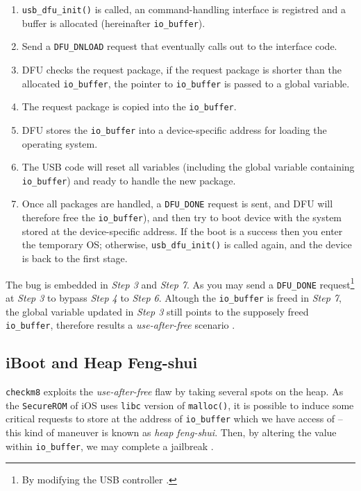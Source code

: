 \documentclass[10pt]{article}
\newcommand{\inlinecode}{\texttt}
\begin{document}
\begin{enumerate}
    \item \inlinecode{usb\_dfu\_init()} is called, an command-handling interface is registred and a buffer is allocated (hereinafter \inlinecode{io\_buffer}).
    \item Send a \inlinecode{DFU\_DNLOAD} request that eventually calls out to the interface code.
    \item DFU checks the request package, if the request package is shorter than the allocated \inlinecode{io\_buffer}, the pointer to \inlinecode{io\_buffer} is passed to a global variable.
    \item The request package is copied into the \inlinecode{io\_buffer}.
    \item DFU stores the \inlinecode{io\_buffer} into a device-specific address for loading the operating system.
    \item The USB code will reset all variables (including the global variable containing \inlinecode{io\_buffer}) and ready to handle the new package.
    \item Once all packages are handled, a \inlinecode{DFU\_DONE} request is sent, and DFU will therefore free the \inlinecode{io\_buffer}), and then try to boot device with the system stored at the device-specific address. If the boot is a success then you enter the temporary OS; otherwise, \inlinecode{usb\_dfu\_init()} is called again, and the device is back to the first stage.
\end{enumerate}

The bug is embedded in \textit{Step 3} and \textit{Step 7}. As you may send a \inlinecode{DFU\_DONE} request\footnote{By modifying the USB controller \cite{cite:5}.} at \textit{Step 3} to bypass \textit{Step 4} to \textit{Step 6}. Altough the \inlinecode{io\_buffer} is freed in \textit{Step 7}, the global variable updated in \textit{Step 3} still points to the supposely freed \inlinecode{io\_buffer}, therefore results a \textit{use-after-free} scenario \cite{cite:1}\cite{cite:5}.

\subsection{iBoot and Heap Feng-shui}
\inlinecode{checkm8} exploits the \textit{use-after-free} flaw by taking several spots on the heap. As the \inlinecode{SecureROM} of iOS uses \inlinecode{libc} version of \inlinecode{malloc()}, it is possible to induce some critical requests to store at the address of \inlinecode{io\_buffer} which we have access of -- this kind of maneuver is known as \textit{heap feng-shui}. Then, by altering the value within \inlinecode{io\_buffer}, we may complete a jailbreak \cite{cite:1}.
\end{document}
